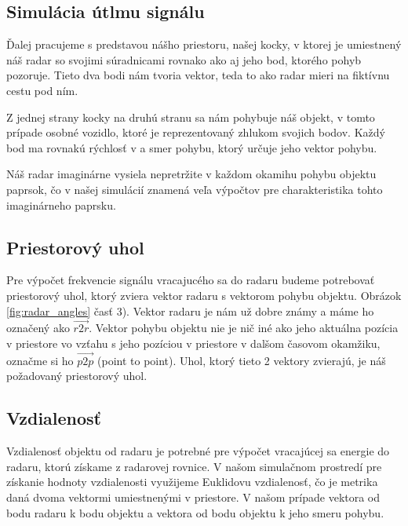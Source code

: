  \subsection{Simulácia útlmu signálu}
    \hspace{0.6cm}Ďalej pracujeme s predstavou nášho priestoru, našej kocky, v ktorej je umiestnený náš radar so svojimi súradnicami rovnako ako aj jeho bod, ktorého pohyb pozoruje. Tieto dva bodi nám tvoria vektor, teda to ako radar mieri na fiktívnu cestu pod ním.

    Z jednej strany kocky na druhú stranu sa nám pohybuje náš objekt, v tomto prípade osobné vozidlo, ktoré je reprezentovaný zhlukom svojich bodov. Každý bod ma rovnakú rýchlosť v a smer pohybu, ktorý určuje jeho vektor pohybu. %

    Náš radar imaginárne vysiela nepretržite v každom okamihu pohybu objektu paprsok, čo v našej simulácií znamená veľa výpočtov pre charakteristika tohto imaginárneho paprsku.
    \newline

    \subsection{Priestorový uhol}

    \hspace{0.6cm}Pre výpočet frekvencie signálu vracajucého sa do radaru budeme potrebovať priestorový uhol, ktorý zviera vektor radaru s vektorom pohybu objektu. Obrázok \ref{fig:radar_angles} časť 3).
    Vektor radaru je nám už dobre známy a máme ho označený ako $\overrightarrow{r2r}$. Vektor pohybu objektu nie je nič iné ako jeho aktuálna pozícia v priestore vo vzťahu s jeho pozíciou v priestore v dalšom časovom okamžiku, označme si ho $\overrightarrow{p2p}$ (point to point).
    Uhol, ktorý tieto 2 vektory zvierajú, je náš požadovaný priestorový uhol.

    \subsection{Vzdialenosť}

    \hspace{0.6cm}Vzdialenosť objektu od radaru je potrebné pre výpočet vracajúcej sa energie do radaru, ktorú získame z radarovej rovnice.
    V našom simulačnom prostredí pre získanie hodnoty vzdialenosti využijeme Euklidovu vzdialenosť, čo je metrika daná dvoma vektormi umiestnenými v priestore.
    V našom prípade vektora od bodu radaru k bodu objektu a vektora od bodu objektu k jeho smeru pohybu.

